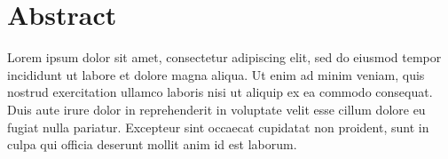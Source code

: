 %
\chapter*{Abstract}%


Lorem ipsum dolor sit amet, consectetur adipiscing elit, sed do eiusmod tempor incididunt ut labore et dolore magna aliqua. Ut enim ad minim veniam, quis nostrud exercitation ullamco laboris nisi ut aliquip ex ea commodo consequat. Duis aute irure dolor in reprehenderit in voluptate velit esse cillum dolore eu fugiat nulla pariatur. Excepteur sint occaecat cupidatat non proident, sunt in culpa qui officia deserunt mollit anim id est laborum.




